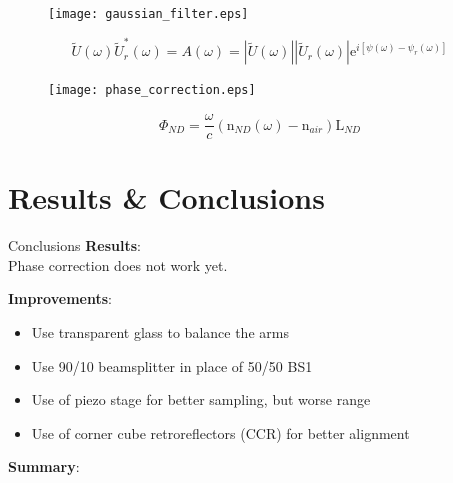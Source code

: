 \documentclass[11pt]{beamer}
\begin{document}

\begin{frame}
\begin{figure}
	\texttt{[image: gaussian\_filter.eps]}
\end{figure}
\begin{equation}
\tilde{U}(\omega)\tilde{U}_r^*(\omega) = A(\omega) = |\tilde{U}(\omega)||\tilde{U}_r(\omega)|\mathrm{e}^{i[\psi(\omega)-\psi_r(\omega)]}
	\label{eq_gauss}
\end{equation}
\end{frame}

\begin{frame}
\begin{figure}
	\texttt{[image: phase\_correction.eps]}
\end{figure}
\begin{equation}
\Phi_{ND} = \frac{\omega}{c}(\mathrm{n}_{ND}(\omega)-\mathrm{n}_{air})\mathrm{L}_{ND}
	\label{eq_ND_phase}
\end{equation}
\end{frame}

\section{Results & Conclusions}
\begin{frame}{Conclusions}
\textbf{Results}:\\
	Phase correction does not work yet.

	\vspace{5pt}
\textbf{Improvements}:\\
	\begin{itemize}
		\item Use transparent glass to balance the arms
		\item Use 90/10 beamsplitter in place of 50/50 BS1
		\item Use of piezo stage for better sampling, but worse range
		\item Use of corner cube retroreflectors (CCR) for better alignment
	\end{itemize}
	
	\vspace{5pt}
\textbf{Summary}:\\
	
\end{frame}
\end{document}
